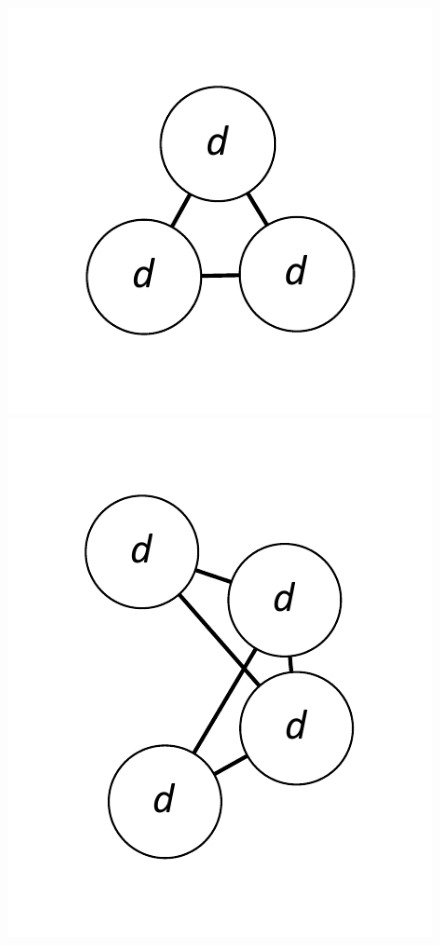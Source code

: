 \documentclass[12pt]{article}
\theoremstyle{plain}
\theoremstyle{definition}
\theoremstyle{remark}
\begin{document}
\begin{figure}[!htb]
\includegraphics[scale=0.25]{Superabundance/all/111[2,2,2].pdf}
\includegraphics[scale=0.25]{Superabundance/all/011111[2,2,3,3].pdf}

\end{figure}
\end{document}
